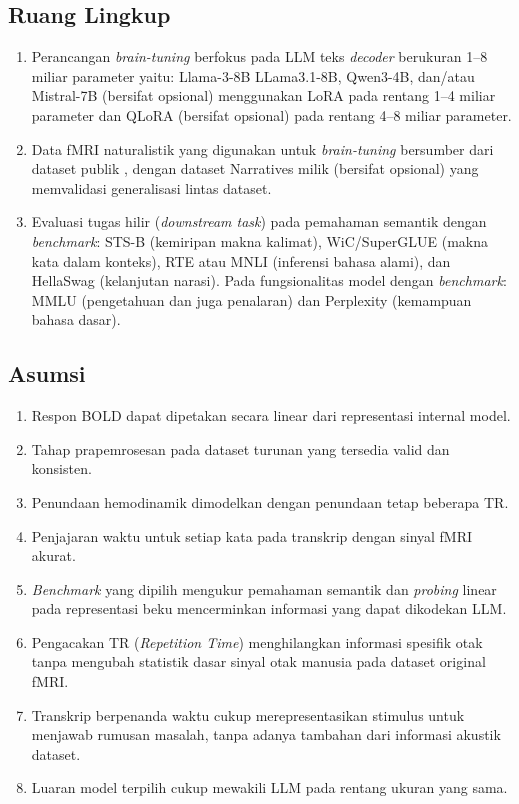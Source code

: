 \subsection*{Ruang Lingkup}
\begin{enumerate}
    \item Perancangan \textit{brain-tuning} berfokus pada LLM teks \textit{decoder} berukuran 1--8 miliar parameter yaitu: Llama-3-8B LLama3.1-8B, Qwen3-4B, dan/atau Mistral-7B (bersifat opsional) menggunakan LoRA pada rentang 1--4 miliar parameter dan QLoRA (bersifat opsional) pada rentang 4--8 miliar parameter.
    \item Data fMRI naturalistik yang digunakan untuk \textit{brain-tuning} bersumber dari dataset publik \textcite{lebel2023natural}, dengan dataset Narratives milik \textcite{nastase2021narratives} (bersifat opsional) yang memvalidasi generalisasi lintas dataset.
    \item Evaluasi tugas hilir (\textit{downstream task}) pada pemahaman semantik dengan \textit{benchmark}: STS-B (kemiripan makna kalimat), WiC/SuperGLUE (makna kata dalam konteks), RTE atau MNLI (inferensi bahasa alami), dan HellaSwag (kelanjutan narasi). Pada fungsionalitas model dengan \textit{benchmark}: MMLU (pengetahuan dan juga penalaran) dan Perplexity (kemampuan bahasa dasar). 
\end{enumerate}

\subsection*{Asumsi}
\begin{enumerate}
    \item Respon BOLD dapat dipetakan secara linear dari representasi internal model.
    \item Tahap prapemrosesan pada dataset turunan yang tersedia valid dan konsisten.
    \item Penundaan hemodinamik dimodelkan dengan penundaan tetap beberapa TR.
    \item Penjajaran waktu untuk setiap kata pada transkrip dengan sinyal fMRI akurat.
    \item \textit{Benchmark} yang dipilih mengukur pemahaman semantik dan \textit{probing} linear pada representasi beku mencerminkan informasi yang dapat dikodekan LLM.
    \item Pengacakan TR (\textit{Repetition Time}) menghilangkan informasi spesifik otak tanpa mengubah statistik dasar sinyal otak manusia pada dataset original fMRI.
    \item Transkrip berpenanda waktu cukup merepresentasikan stimulus untuk menjawab rumusan masalah, tanpa adanya tambahan dari informasi akustik dataset.
    \item Luaran model terpilih cukup mewakili LLM pada rentang ukuran yang sama.
\end{enumerate}


